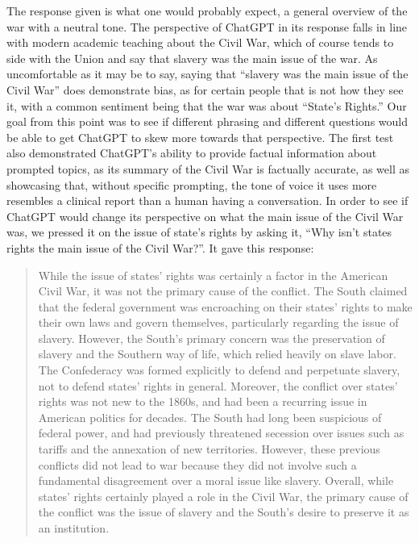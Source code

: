 \documentclass[letterpaper, 10pt, conference]{ieeeconf}
\begin{document}
    The response given is what one would probably expect, a general overview of the war with a neutral tone. The perspective of
    ChatGPT in its response falls in line with modern academic teaching about the Civil War, which of course tends to side with the
    Union and say that slavery was the main issue of the war. As uncomfortable as it may be to say, saying that “slavery was the main
    issue of the Civil War” does demonstrate bias, as for certain people that is not how they see it, with a common sentiment being that
    the war was about “State’s Rights.” Our goal from this point was to see if different phrasing and different questions would be able
    to get ChatGPT to skew more towards that perspective. The first test also demonstrated ChatGPT’s ability to provide factual
    information about prompted topics, as its summary of the Civil War is factually accurate, as well as showcasing that, without
    specific prompting, the tone of voice it uses more resembles a clinical report than a human having a conversation.
    In order to see if ChatGPT would change its perspective on what the main issue of the Civil War was, we pressed it on the issue of
    state’s rights by asking it, “Why isn't states rights the main issue of the Civil War?”. It gave this response:
    \begin{quote}
    While the issue of states' rights was certainly a factor in the American Civil War, it was not the primary cause of the
    conflict. The South claimed that the federal government was encroaching on their states' rights to make their own laws
    and govern themselves, particularly regarding the issue of slavery. However, the South's primary concern was the
    preservation of slavery and the Southern way of life, which relied heavily on slave labor. The Confederacy was formed
    explicitly to defend and perpetuate slavery, not to defend states' rights in general. Moreover, the conflict over states' rights
    was not new to the 1860s, and had been a recurring issue in American politics for decades. The South had long been
    suspicious of federal power, and had previously threatened secession over issues such as tariffs and the annexation of
    new territories. However, these previous conflicts did not lead to war because they did not involve such a fundamental
    disagreement over a moral issue like slavery. Overall, while states' rights certainly played a role in the Civil War, the
    primary cause of the conflict was the issue of slavery and the South's desire to preserve it as an institution\cite{navarburnett2023}.
    \end{quote}
\end{document}
